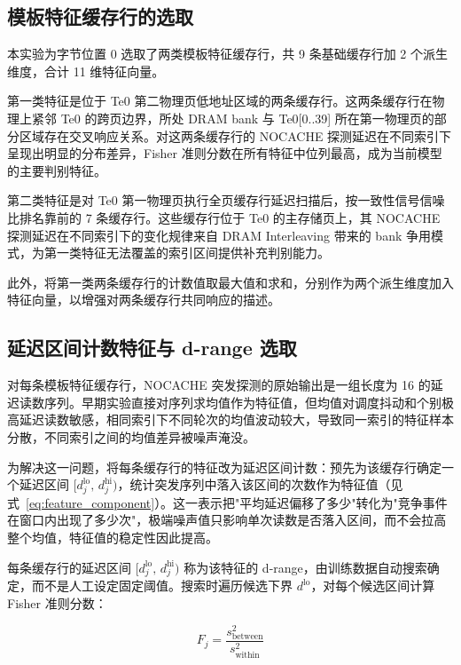 \subsection{模板特征缓存行的选取}

本实验为字节位置 0 选取了两类模板特征缓存行，共 9 条基础缓存行加 2 个派生维度，合计 11 维特征向量。

第一类特征是位于 Te0 第二物理页低地址区域的两条缓存行。这两条缓存行在物理上紧邻 Te0 的跨页边界，所处 DRAM bank 与 Te0[0..39] 所在第一物理页的部分区域存在交叉响应关系。对这两条缓存行的 NOCACHE 探测延迟在不同索引下呈现出明显的分布差异，Fisher 准则分数在所有特征中位列最高，成为当前模型的主要判别特征。

第二类特征是对 Te0 第一物理页执行全页缓存行延迟扫描后，按一致性信号信噪比排名靠前的 7 条缓存行。这些缓存行位于 Te0 的主存储页上，其 NOCACHE 探测延迟在不同索引下的变化规律来自 DRAM Interleaving 带来的 bank 争用模式，为第一类特征无法覆盖的索引区间提供补充判别能力。

此外，将第一类两条缓存行的计数值取最大值和求和，分别作为两个派生维度加入特征向量，以增强对两条缓存行共同响应的描述。

\subsection{延迟区间计数特征与 d-range 选取}

对每条模板特征缓存行，NOCACHE 突发探测的原始输出是一组长度为 16 的延迟读数序列。早期实验直接对序列求均值作为特征值，但均值对调度抖动和个别极高延迟读数敏感，相同索引下不同轮次的均值波动较大，导致同一索引的特征样本分散，不同索引之间的均值差异被噪声淹没。

为解决这一问题，将每条缓存行的特征改为延迟区间计数：预先为该缓存行确定一个延迟区间 $[d_j^{\mathrm{lo}},\, d_j^{\mathrm{hi}})$，统计突发序列中落入该区间的次数作为特征值（见式~\eqref{eq:feature_component}）。这一表示把"平均延迟偏移了多少"转化为"竞争事件在窗口内出现了多少次"，极端噪声值只影响单次读数是否落入区间，而不会拉高整个均值，特征值的稳定性因此提高。

每条缓存行的延迟区间 $[d_j^{\mathrm{lo}},\, d_j^{\mathrm{hi}})$ 称为该特征的 d-range，由训练数据自动搜索确定，而不是人工设定固定阈值。搜索时遍历候选下界 $d^{\mathrm{lo}}$，对每个候选区间计算 Fisher 准则分数：

\begin{equation}
  F_j = \frac{s_{\mathrm{between}}^2}{s_{\mathrm{within}}^2}
  \label{eq:fisher_criterion}
\end{equation}

